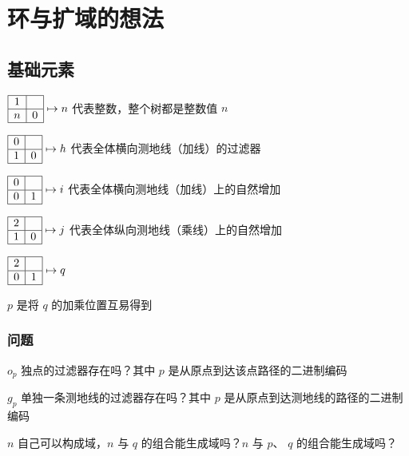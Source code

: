 \documentclass[a4paper,12pt]{article}
\begin{document}
\newpage

\section{环与扩域的想法}

\subsection{基础元素}

$\begin{array}{|c|c|}\hline 1&\space\\\hline n&0\\\hline\end{array} \mapsto n$ 代表整数，整个树都是整数值 $n$

$\begin{array}{|c|c|}\hline0&\space\\\hline 1&0\\\hline\end{array} \mapsto h$ 代表全体横向测地线（加线）的过滤器

$\begin{array}{|c|c|}\hline0&\space\\\hline 0&1\\\hline\end{array} \mapsto i$ 代表全体横向测地线（加线）上的自然增加

$\begin{array}{|c|c|}\hline2&\space\\\hline 1&0\\\hline\end{array} \mapsto j$ 代表全体纵向测地线（乘线）上的自然增加

$\begin{array}{|c|c|}\hline2&\space\\\hline 0&1\\\hline\end{array} \mapsto q$

$p$ 是将 $q$ 的加乘位置互易得到

\subsubsection{问题}

$o_p$ 独点的过滤器存在吗？其中 $p$ 是从原点到达该点路径的二进制编码

$g_p$ 单独一条测地线的过滤器存在吗？其中 $p$ 是从原点到达测地线的路径的二进制编码

$n$ 自己可以构成域，$n$ 与 $q$ 的组合能生成域吗？$n$ 与 $p$、 $q$ 的组合能生成域吗？
\end{document}
